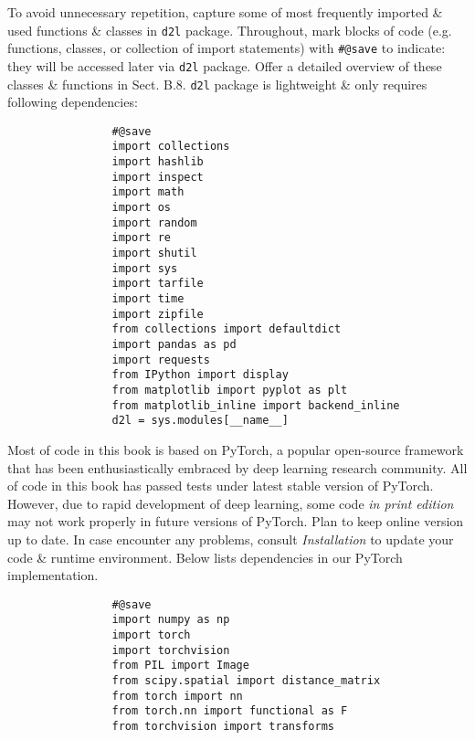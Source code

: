 \documentclass{article}
\begin{document}
\begin{itemize}
\begin{itemize}
\begin{itemize}
			To avoid unnecessary repetition, capture some of most frequently imported \& used functions \& classes in {\tt d2l} package. Throughout, mark blocks of code (e.g. functions, classes, or collection of import statements) with \verb|#@save| to indicate: they will be accessed later via {\tt d2l} package. Offer a detailed overview of these classes \& functions in Sect. B.8. {\tt d2l} package is lightweight \& only requires following dependencies:
			\begin{verbatim}
				#@save
				import collections
				import hashlib
				import inspect
				import math
				import os
				import random
				import re
				import shutil
				import sys
				import tarfile
				import time
				import zipfile
				from collections import defaultdict
				import pandas as pd
				import requests
				from IPython import display
				from matplotlib import pyplot as plt
				from matplotlib_inline import backend_inline
				d2l = sys.modules[__name__]
			\end{verbatim}
			Most of code in this book is based on PyTorch, a popular open-source framework that has been enthusiastically embraced by deep learning research community. All of code in this book has passed tests under latest stable version of PyTorch. However, due to rapid development of deep learning, some code {\it in print edition} may not work properly in future versions of PyTorch. Plan to keep online version up to date. In case encounter any problems, consult {\it Installation} to update your code \& runtime environment. Below lists dependencies in our PyTorch implementation.
			\begin{verbatim}
				#@save
				import numpy as np
				import torch
				import torchvision
				from PIL import Image
				from scipy.spatial import distance_matrix
				from torch import nn
				from torch.nn import functional as F
				from torchvision import transforms
			\end{verbatim}

\end{itemize}
\end{itemize}
\end{itemize}
\end{document}
